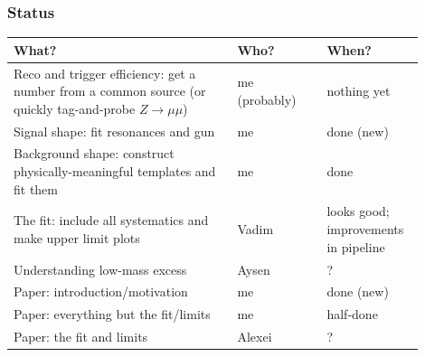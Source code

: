 \documentclass[compress]{beamer}
\begin{document}

\small

\begin{frame}
\frametitle{Status}
\renewcommand{\arraystretch}{1.4}
\begin{tabular}{p{0.5\linewidth} p{0.2\linewidth} p{0.2\linewidth}}
What? & Who? & When? \\\hline
Reco and trigger efficiency: get a number from a common source (or
quickly tag-and-probe $Z\to\mu\mu$) & me (probably) & nothing yet \\

Signal shape: fit resonances and gun & me & done (new) \\

Background shape: construct physically-meaningful templates and fit them & me & done \\

The fit: include all systematics and make upper limit plots & Vadim & looks good; improvements in pipeline \\

Understanding low-mass excess & Aysen & ? \\

Paper: introduction/motivation & me & done (new) \\

Paper: everything but the fit/limits & me & half-done \\

Paper: the fit and limits & Alexei & ? \\
\end{tabular}
\end{frame}
\end{document}
